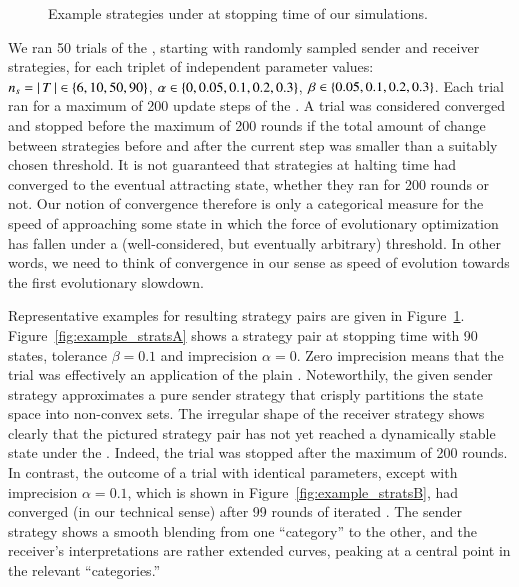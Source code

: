 \documentclass[fleqn,reqno,10pt]{article}
\newcommand{\rd}{\acro{rd}} %
\newcommand{\rdd}{\acro{rdd}} %
\newcommand{\impairment}{\ensuremath{\alpha}} %
\newcommand{\toler}{\ensuremath{\beta}} %
\newcommand{\ns}{\ensuremath{n_s}} %
\begin{document}
\begin{figure}


  \caption{Example strategies under \rdd at stopping time of our simulations.}
  \label{fig:example_strats}
\end{figure}

We ran 50 trials of the \rdd, starting with randomly sampled sender
and receiver strategies, for each triplet of independent parameter
values: $\ns = \card{T} \in \set{6, 10, 50, 90}$, $\impairment \in
\set{0, 0.05, 0.1, 0.2, 0.3}$, $\toler \in \set{0.05, 0.1, 0.2,
  0.3}$. Each trial ran for a maximum of 200 update steps of the
\rdd. A trial was considered converged and stopped before the maximum
of 200 rounds if the total amount of change between strategies before
and after the current \rdd step was smaller than a suitably chosen
threshold. It is not guaranteed that strategies at halting time had
converged to the eventual attracting state, whether they ran for 200
rounds or not. Our notion of convergence therefore is only a
categorical measure for the speed of approaching some state in which
the force of evolutionary optimization has fallen under a
(well-considered, but eventually arbitrary) threshold. In other words,
we need to think of convergence in our sense as speed of evolution
towards the first evolutionary slowdown.

Representative examples for resulting strategy pairs are given in
Figure~\ref{fig:example_strats}. Figure~\ref{fig:example_stratsA}
shows a strategy pair at stopping time with 90 states, tolerance
$\toler = 0.1$ and imprecision $\impairment = 0$. Zero imprecision
means that the trial was effectively an application of the plain
\rd. Noteworthily, the given sender strategy approximates a pure
sender strategy that crisply partitions the state space into
non-convex sets. The irregular shape of the receiver strategy shows
clearly that the pictured strategy pair has not yet reached a
dynamically stable state under the \rd. Indeed, the trial was stopped
after the maximum of 200 rounds. In contrast, the outcome of a trial
with identical parameters, except with imprecision $\impairment =
0.1$, which is shown in Figure~\ref{fig:example_stratsB}, had
converged (in our technical sense) after 99 rounds of iterated
\rdd. The sender strategy shows a smooth blending from one
``category'' to the other, and the receiver's interpretations are
rather extended curves, peaking at a central point in the relevant
``categories.''
\end{document}
